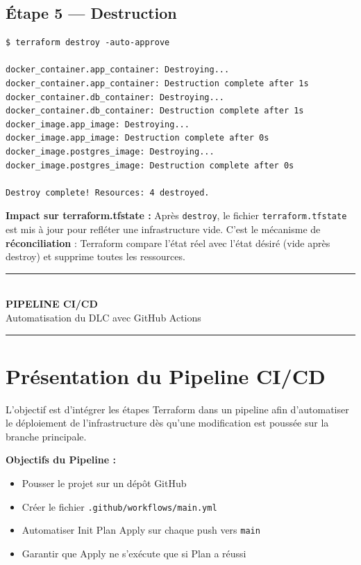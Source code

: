 \documentclass[12pt,a4paper]{article}
\begin{document}
\subsection{Étape 5 --- Destruction}

\begin{lstlisting}[style=termStyle, caption=terraform destroy]
$ terraform destroy -auto-approve

docker_container.app_container: Destroying...
docker_container.app_container: Destruction complete after 1s
docker_container.db_container: Destroying...
docker_container.db_container: Destruction complete after 1s
docker_image.app_image: Destroying...
docker_image.app_image: Destruction complete after 0s
docker_image.postgres_image: Destroying...
docker_image.postgres_image: Destruction complete after 0s

Destroy complete! Resources: 4 destroyed.
\end{lstlisting}

\begin{warnbox}
\textbf{Impact sur terraform.tfstate :} Après \texttt{destroy}, le fichier
\texttt{terraform.tfstate} est mis à jour pour refléter une infrastructure vide.
C'est le mécanisme de \textbf{réconciliation} : Terraform compare l'état réel
avec l'état désiré (vide après destroy) et supprime toutes les ressources.
\end{warnbox}

\newpage
\begin{center}
  \rule{\linewidth}{2pt}\\[0.5em]
  {\LARGE\bfseries\textcolor{cicdGreen}{PIPELINE CI/CD}}\\[0.3em]
  {\Large Automatisation du DLC avec GitHub Actions}\\[0.3em]
  \rule{\linewidth}{2pt}
\end{center}

\section{\textcolor{cicdGreen}{Présentation du Pipeline CI/CD}}

L'objectif est d'intégrer les étapes Terraform dans un pipeline afin
d'automatiser le déploiement de l'infrastructure dès qu'une modification
est poussée sur la branche principale.

\begin{cicdbox}
\textbf{Objectifs du Pipeline :}
\begin{itemize}[leftmargin=1.5em]
  \item Pousser le projet sur un dépôt GitHub
  \item Créer le fichier \texttt{.github/workflows/main.yml}
  \item Automatiser Init \textrightarrow{} Plan \textrightarrow{} Apply sur chaque push vers \texttt{main}
  \item Garantir que Apply ne s'exécute que si Plan a réussi
\end{itemize}
\end{cicdbox}
\end{document}
